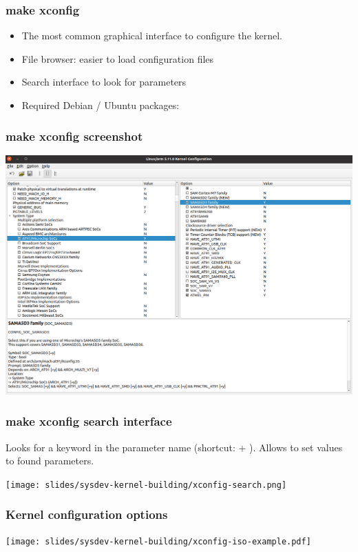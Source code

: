 \begin{frame}
  \frametitle{make xconfig}
  \begin{itemize}
  \item The most common graphical interface to configure the kernel.
  \item File browser: easier to load configuration files
  \item Search interface to look for parameters
 \item Required Debian / Ubuntu packages: 
  \end{itemize}
\end{frame}

\begin{frame}
  \frametitle{make xconfig screenshot}
  \begin{center}
    \includegraphics[height=0.8\textheight]{slides/sysdev-kernel-building/xconfig-screenshot.png}
  \end{center}
\end{frame}

\begin{frame}
  \frametitle{make xconfig search interface}
  Looks for a keyword in the parameter name (shortcut: \code{[Ctrl]} + \code{[f]}).
  \newline Allows to set values to found parameters.
  \begin{center}
    \texttt{[image: slides/sysdev-kernel-building/xconfig-search.png]}
  \end{center}
\end{frame}

\begin{frame}
\frametitle{Kernel configuration options}
  \begin{center}
    \texttt{[image: slides/sysdev-kernel-building/xconfig-iso-example.pdf]}
  \end{center}
\end{frame}

